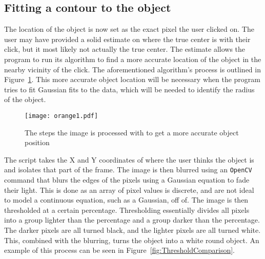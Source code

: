 
\subsection{Fitting a contour to the object}
The location of the object is now set as the exact pixel the user clicked on. The user may have provided a solid estimate on where the true center is with their click, but it most likely not actually the true center. The estimate allows the program to run its algorithm to find a more accurate location of the object in the nearby vicinity of the click. The aforementioned algorithm's process is outlined in Figure~\ref{fig:contourfinder}. This more accurate object location will be necessary when the program tries to fit Gaussian fits to the data, which will be needed to identify the radius of the object.

\begin{figure}[h!]
	\centering
	\texttt{[image: orange1.pdf]}
	\caption{The steps the image is processed with to get a more accurate object position}
	\label{fig:contourfinder}
\end{figure}

The script takes the X and Y coordinates of where the user thinks the object is and isolates that part of the frame. The image is then blurred using an \texttt{OpenCV} command that blurs the edges of the pixels using a Gaussian equation to fade their light. This is done as an array of pixel values is discrete, and are not ideal to model a continuous equation, such as a Gaussian, off of. The image is then thresholded at a certain percentage. Thresholding essentially divides all pixels into a group lighter than the percentage and a group darker than the percentage. The darker pixels are all turned black, and the lighter pixels are all turned white. This, combined with the blurring, turns the object into a white round object. An example of this process can be seen in Figure~\ref{fig:ThresholdComparison}.

